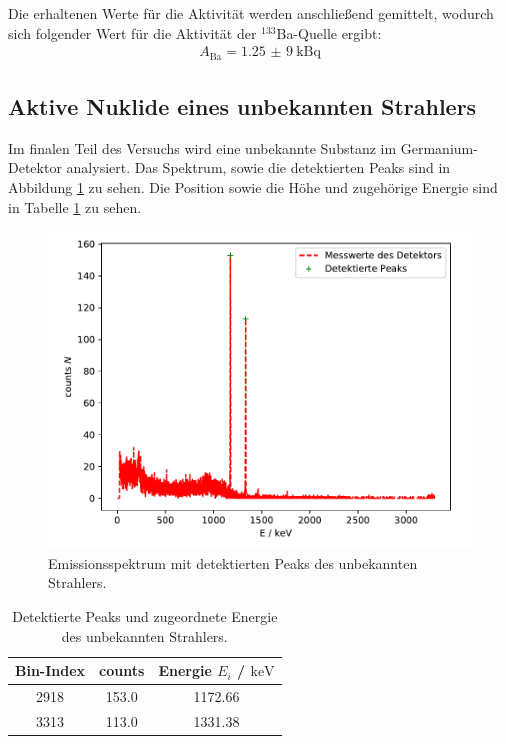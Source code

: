\FloatBarrier
Die erhaltenen Werte für die Aktivität werden anschließend gemittelt, wodurch sich folgender Wert für die Aktivität der $^{133}$Ba-Quelle ergibt:
\begin{align*}
    A_\text{Ba} = \SI{1,25(9)}{\kilo \becquerel}
\end{align*}
\FloatBarrier


\subsection{Aktive Nuklide eines unbekannten Strahlers}
Im finalen Teil des Versuchs wird eine unbekannte Substanz im Germanium-Detektor analysiert. Das Spektrum, sowie die detektierten Peaks sind in Abbildung \ref{abb:unbekannt} zu sehen. Die Position sowie die Höhe und zugehörige Energie sind in Tabelle \ref{tab:unbekannt} zu sehen.
\FloatBarrier
\begin{figure}
    \centering
    \includegraphics[scale=0.7]{unbekannterStrahler.pdf}
    \caption{Emissionsspektrum mit detektierten Peaks des unbekannten Strahlers.}
    \label{abb:unbekannt}
\end{figure}
\FloatBarrier
\begin{table}
    \centering
    \caption{Detektierte Peaks und zugeordnete Energie des unbekannten Strahlers.}
    \label{tab:unbekannt}
    \begin{tabular}{ c c c }
    \toprule
    {Bin-Index} & {counts } & {Energie $E_i$ / $\si{\kilo\electronvolt}$}\\
    \midrule
    2918 & 153.0 & 1172.66       \\
    3313 & 113.0 & 1331.38       \\
    \bottomrule
    \end{tabular}
\end{table}
\FloatBarrier

